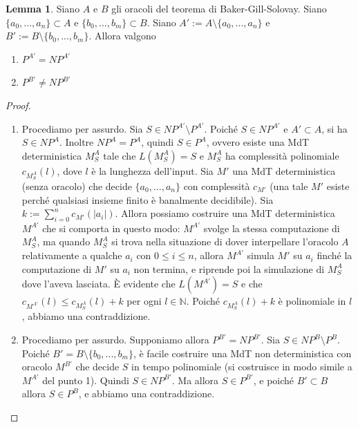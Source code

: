 \documentclass[12pt,a4paper]{report}
\theoremstyle{definition}
\newtheorem{lemma}[teo]{Lemma}  %
\begin{document}
\begin{lemma}\label{lemma_oracoli_tagliati}
Siano $A$ e $B$ gli oracoli del teorema di Baker-Gill-Solovay. Siano $\{a_0,...,a_n\} \subset A$ e $\{b_0,...,b_m\} \subset B$. Siano $A':= A \setminus \{a_0,...,a_n\}$ e $B':= B \setminus \{b_0,...,b_m\}$. Allora valgono
\begin{enumerate}
\item $P^{A'}=NP^{A'}$
\item $P^{B'} \neq NP^{B'}$
\end{enumerate}
\begin{proof}\
\begin{enumerate}
\item Procediamo per assurdo. Sia $S \in NP^{A'} \setminus P^{A'}$. Poiché $S \in NP^{A'}$ e $A' \subset A$, si ha $S \in NP^A$. Inoltre $NP^A=P^A$, quindi $S \in P^A$, ovvero esiste una MdT deterministica $M_S^A$ tale che $L(M_S^A)=S$ e $M_S^A$ ha complessità polinomiale $c_{M_S^A}(l)$, dove $l$ è la lunghezza dell'input. Sia $M'$ una MdT deterministica (senza oracolo) che decide $\{a_0,...,a_n\}$ con complessità $c_{M'}$ (una tale $M'$ esiste perché qualsiasi insieme finito è banalmente decidibile). Sia $k:= \sum_{i=0}^n c_{M'}(|a_i|)$. Allora possiamo costruire una MdT deterministica $M^{A'}$ che si comporta in questo modo: $M^{A'}$ svolge la stessa computazione di $M_S^A$, ma quando $M_S^A$ si trova nella situazione di dover interpellare l'oracolo $A$ relativamente a qualche $a_i$ con $0 \leq i \leq n$, allora $M^{A'}$ simula $M'$ su $a_i$ finché la computazione di $M'$ su $a_i$ non termina, e riprende poi la simulazione di $M_S^A$ dove l'aveva lasciata. È evidente che $L(M^{A'})=S$ e che $c_{M^{A'}}(l) \leq c_{M_S^A}(l) + k$ per ogni $l \in \mathbb{N}$. Poiché $c_{M_S^A}(l) + k$ è polinomiale in $l$, abbiamo una contraddizione.
\item Procediamo per assurdo. Supponiamo allora $P^{B'}=NP^{B'}$. Sia $S \in NP^B \setminus P^B$. Poiché $B'= B \setminus \{b_0,...,b_m\}$, è facile costruire una MdT non deterministica con oracolo $M^{B'}$ che decide $S$ in tempo polinomiale (si costruisce in modo simile a $M^{A'}$ del punto 1). Quindi $S \in NP^{B'}$. Ma allora $S \in P^{B'}$, e poiché $B' \subset B$ allora $S \in P^B$, e abbiamo una contraddizione.
\end{enumerate}
\end{proof}
\end{lemma}
\end{document}
